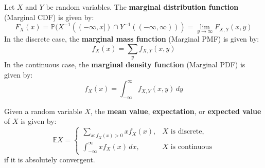 \documentclass{huhtakm-template-book-v2}
\newcommand{\prob}{\mathbb{P}}
\newcommand{\expect}{\mathbb{E}}
\begin{document}
    \begin{sdefn}
        Let $X$ and $Y$ be random variables. The \textbf{marginal distribution function} (Marginal CDF) is given by:
        \begin{equation*}
            F_{X}(x) = \prob(X^{-1}((-\infty, x]) \cap Y^{-1}((-\infty, \infty))) = \lim_{y \to \infty}F_{X,Y}(x, y)
        \end{equation*}
        In the discrete case, the \textbf{marginal mass function} (Marginal PMF) is given by:
        \begin{equation*}
            f_{X}(x) = \sum_{y}f_{X,Y}(x, y)
        \end{equation*}
        In the continuous case, the \textbf{marginal density function} (Marginal PDF) is given by:
        \begin{equation*}
            f_{X}(x) = \int_{-\infty}^{\infty} f_{X,Y}(x, y)\,dy
        \end{equation*}
    \end{sdefn}
    \begin{sdefn}
        Given a random variable $X$, the \textbf{mean value}, \textbf{expectation}, or \textbf{expected value} of $X$ is given by:
        \begin{equation*}
            \expect{X} = \begin{cases}
                \sum_{x : f_{X}(x) > 0}xf_{X}(x), & X \text{ is discrete},\\
                \int_{-\infty}^{\infty} xf_{X}(x)\,dx, & X \text{ is continuous}
            \end{cases}
        \end{equation*}
        if it is absolutely convergent.
    \end{sdefn}
\end{document}
